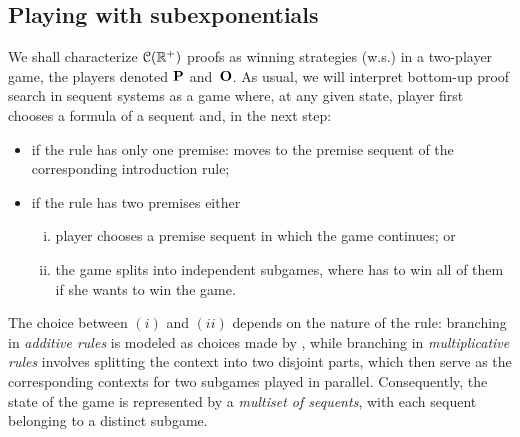 \subsection{Playing with subexponentials}
We shall  characterize $\mathcal{C}(\mathbb{R}^+)$ proofs as winning strategies (w.s.) in a two-player game, the players denoted $\mathbf{P}$ and~$\mathbf{O}$. As usual, 
we will interpret bottom-up proof search in sequent systems as a game where,  at any given state, player \I first 
chooses a formula of a sequent and, in the next step: 
\begin{itemize}
\item if the rule has
only one premise: \I moves to the premise sequent of the corresponding introduction rule; 
\item if the rule has two premises either
\begin{enumerate}[(i)]
\item player \II
chooses 
a premise sequent in which the game continues; or
\item  the game splits into independent subgames, where \I has to win all of them if she wants to win the game.
\end{enumerate}
\end{itemize}
The choice between $(i)$ and $(ii)$ depends on the nature of the rule:
branching in {\em additive rules} is modeled as choices made by \II, while branching in {\em multiplicative rules} involves \I splitting the context into two disjoint parts, which then serve as the corresponding contexts for two subgames played in parallel. Consequently, the state of the game is represented by a \textit{multiset of sequents}, with each sequent belonging to a distinct subgame.

